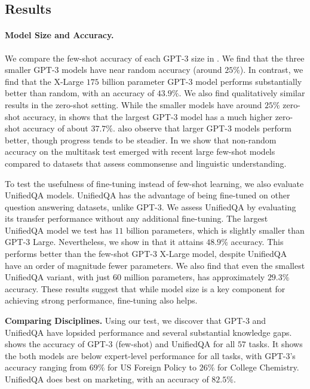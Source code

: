 \documentclass{article}
\begin{document}
\subsection{Results}

\paragraph{Model Size and Accuracy.}

We compare the few-shot accuracy of each GPT-3 size in . We find that the three smaller GPT-3 models have near random accuracy (around $25\%$). 
In contrast, we find that the X-Large $175$ billion parameter GPT-3 model performs substantially better than random, with an accuracy of $43.9\%$. We also find qualitatively similar results in the zero-shot setting. While the smaller models have around $25\%$ zero-shot accuracy,  in  shows that the largest GPT-3 model has a much higher zero-shot accuracy of about $37.7\%$. \citet{brown2020gpt3} also observe that larger GPT-3 models perform better, though progress tends to be steadier. In  we show that non-random accuracy on the multitask test emerged with recent large few-shot models compared to datasets that assess commonsense and linguistic understanding.

To test the usefulness of fine-tuning instead of few-shot learning, we also evaluate UnifiedQA models. 
UnifiedQA has the advantage of being fine-tuned on other question answering datasets, unlike GPT-3. We assess UnifiedQA 
by evaluating its transfer performance without any additional fine-tuning. The largest UnifiedQA model we test has $11$ billion parameters, which is slightly smaller than GPT-3 Large. Nevertheless, we show in  that it attains $48.9\%$ accuracy. This performs better than the few-shot GPT-3 X-Large model, despite UnifiedQA have an order of magnitude fewer parameters. We also find that even the smallest UnifiedQA variant, with just $60$ million parameters, has approximately $29.3\%$ accuracy.
These results suggest that while model size is a key component for achieving strong performance, fine-tuning also helps.

\noindent\textbf{Comparing Disciplines.}\quad
Using our test, we discover that GPT-3 and UnifiedQA have lopsided performance and several substantial knowledge gaps.  shows the accuracy of GPT-3 (few-shot) and UnifiedQA for all $57$ tasks. It shows the both models are below expert-level performance for all tasks, with GPT-3's accuracy ranging from $69\%$ for US Foreign Policy to $26\%$ for College Chemistry. UnifiedQA does best on marketing, with an accuracy of $82.5\%$.
\end{document}
